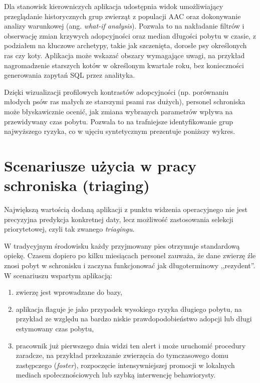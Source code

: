 Dla stanowisk kierowniczych aplikacja udostępnia widok umożliwiający przeglądanie historycznych grup zwierząt z populacji AAC oraz dokonywanie analizy warunkowej (ang. \emph{what-if analysis}). Pozwala to na nakładanie filtrów i obserwację zmian krzywych adopcyjności oraz median długości pobytu w czasie, z podziałem na kluczowe archetypy, takie jak szczenięta, dorosłe psy określonych ras czy koty. Aplikacja może wskazać obszary wymagające uwagi, na przykład nagromadzenie starszych kotów w określonym kwartale roku, bez konieczności generowania zapytań SQL przez analityka.

Dzięki wizualizacji profilowych kontrastów adopcyjności (np. porównaniu młodych psów ras małych ze starszymi psami ras dużych), personel schroniska może błyskawicznie ocenić, jak zmiana wybranych parametrów wpływa na przewidywany czas pobytu. Pozwala to na trafniejsze identyfikowanie grup najwyższego ryzyka, co w ujęciu syntetycznym prezentuje poniższy wykres.


\section{Scenariusze użycia w pracy schroniska (triaging)}
\label{sec:scenariusze-uzycia-triaging}

Największą wartością dodaną aplikacji z punktu widzenia operacyjnego nie jest precyzyjna predykcja konkretnej daty, lecz możliwość zastosowania selekcji priorytetowej, czyli tak zwanego \emph{triagingu}.

W tradycyjnym środowisku każdy przyjmowany pies otrzymuje standardową opiekę. Czasem dopiero po kilku miesiącach personel zauważa, że dane zwierzę źle znosi pobyt w schronisku i zaczyna funkcjonować jak długoterminowy ,,rezydent''. W scenariuszu wspartym aplikacją:

\begin{enumerate}
    \item zwierzę jest wprowadzane do bazy,
    \item aplikacja flaguje je jako przypadek wysokiego ryzyka długiego pobytu, na przykład ze względu na bardzo niskie prawdopodobieństwo adopcji lub długi estymowany czas pobytu,
    \item pracownik już pierwszego dnia widzi ten alert i może uruchomić procedury zaradcze, na przykład przekazanie zwierzęcia do tymczasowego domu zastępczego (\emph{foster}), rozpoczęcie intensywniejszej promocji w lokalnych mediach społecznościowych lub szybką interwencję behawiorysty.
\end{enumerate}

